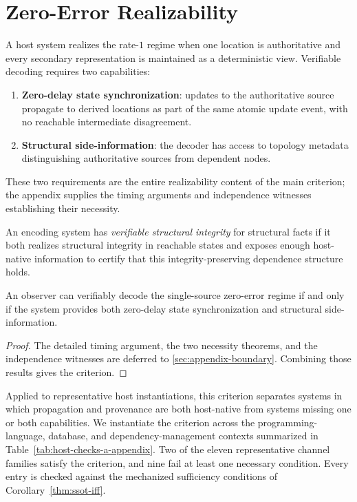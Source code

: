 \section{Zero-Error Realizability}\label{sec:requirements}

A host system realizes the rate-$1$ regime when one location is authoritative and every secondary representation is maintained as a deterministic view. Verifiable decoding requires two capabilities:
\begin{enumerate}
\item \textbf{Zero-delay state synchronization}: updates to the authoritative source propagate to derived locations as part of the same atomic update event, with no reachable intermediate disagreement.
\item \textbf{Structural side-information}: the decoder has access to topology metadata distinguishing authoritative sources from dependent nodes.
\end{enumerate}
These two requirements are the entire realizability content of the main criterion; the appendix supplies the timing arguments and independence witnesses establishing their necessity.

\begin{definition}\label{def:verifiable-integrity-main}
An encoding system has \emph{verifiable structural integrity} for structural facts if it both realizes structural integrity in reachable states and exposes enough host-native information to certify that this integrity-preserving dependence structure holds.
\end{definition}

\begin{corollary}\label{thm:ssot-iff}
An observer can verifiably decode the single-source zero-error regime if and only if the system provides both zero-delay state synchronization and structural side-information.
\end{corollary}

\begin{proof}
The detailed timing argument, the two necessity theorems, and the independence witnesses are deferred to \ref{sec:appendix-boundary}. Combining those results gives the criterion.
\end{proof}

Applied to representative host instantiations, this criterion separates systems in which propagation and provenance are both host-native from systems missing one or both capabilities. We instantiate the criterion across the programming-language, database, and dependency-management contexts summarized in Table~\ref{tab:host-checks-a-appendix}. Two of the eleven representative channel families satisfy the criterion, and nine fail at least one necessary condition. Every entry is checked against the mechanized sufficiency conditions of Corollary~\ref{thm:ssot-iff}.


